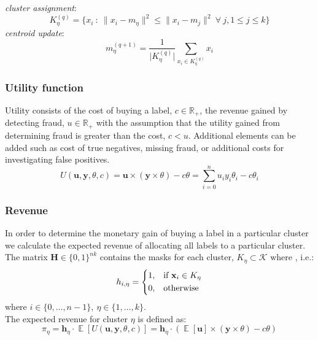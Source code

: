 \documentclass[paper=a4, fontsize=12pt]{scrartcl}
\begin{document}
\noindent\textit{cluster assignment}:
\begin{equation}
K_{\eta}^{(q)} = \{x_i~:~\lVert x_i - m_{\eta} \rVert^{2} \leq \lVert x_i - m_{j} \rVert^{2}~\forall~j, 1 \leq j \leq k\}
\end{equation}
\textit{centroid update}:
\begin{equation}
m_{\eta}^{(q + 1)} = \frac{1}{\lvert K_{\eta}^{(q)}\rvert}\sum_{x_{i} \in K_{\eta}^{(q)}} x_{i}
\end{equation}

\subsubsection*{Utility function}
Utility consists of the cost of buying a label, $c \in \mathbb{R_{+}}$, the revenue gained by detecting fraud, $u \in \mathbb{R_+}$ with the assumption that the
utility gained from determining fraud is greater than the cost, $c < u$. Additional elements can be added such as cost of true negatives, missing fraud, or additional costs for investigating false positives.
\begin{equation}
U(\textbf{u}, \mathbf{y}, \theta, c) = \textbf{u} \times (\textbf{y} \times \theta) - c \theta = \sum_{i=0}^{n}u_{i}y_{i}\theta_{i} - c\theta_{i}
\end{equation}

\subsubsection*{Revenue}
In order to determine the monetary gain of buying a label in a particular cluster we calculate the expected revenue of allocating all labels to a particular cluster. The matrix $\textbf{H} \in \{0,1\}^{nk}$ contains the masks for each cluster, $K_\eta \subset \mathcal{K} \text{ where } $, i.e.:
\begin{equation}
h_{i,\eta}=
\begin{dcases}
1,& \text{if } \textbf{x}_{i} \in K_\eta\\
0, & \text{otherwise}
\end{dcases}
\end{equation}
where $i \in \{0,\ldots,n-1\},~\eta \in \{1, \ldots, k\}$.\\

The expected revenue for cluster $\eta$ is defined as:
\begin{equation}
\pi_{\eta} = \textbf{h}_{\eta} \cdot \mathop{\mathbb{E}}[U(\textbf{u}, \mathbf{y}, \theta, c)] = \textbf{h}_{\eta} \cdot (\mathop{\mathbb{E}}[\textbf{u}] \times (\textbf{y} \times \theta) - c\theta)
\end{equation}
\end{document}
